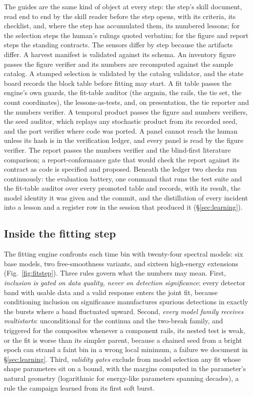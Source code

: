The guides are the same kind of object at every step: the step's skill
document, read end to end by the skill reader before the step opens, with
its criteria, its checklist, and, where the step has accumulated them, its
numbered lessons; for the selection
steps the human's rulings quoted verbatim; for the figure and report steps
the standing contracts. The sensors differ by step because the artifacts
differ. A harvest manifest is validated against its schema. An inventory
figure passes the figure verifier and its numbers are recomputed against
the sample catalog. A stamped selection is validated by the catalog
validator, and the state board records the block table before fitting may
start. A fit table passes the engine's own guards, the fit-table auditor
(the argmin, the rails, the tie set, the count coordinates), the
lessons-as-tests, and, on presentation, the tie reporter and the numbers
verifier. A temporal product passes the figure and numbers verifiers, the
seed auditor, which replays any stochastic product from its recorded seed,
and the port verifier where code was ported. A panel cannot reach the human
unless its hash is in the verification ledger, and every panel is read by
the figure verifier. The report passes the numbers verifier and the
blind-first literature comparison; a report-conformance gate that would
check the report against its contract as code is specified and proposed.
Beneath the ledger two checks run continuously: the evaluation battery,
one command that runs the test suite and the fit-table auditor over every
promoted table and records, with its result, the model identity it was
given and the commit,
and the distillation of every incident into a lesson and a register row
in the session that produced it (\S\ref{sec:learning}).

\subsection{Inside the fitting step} \label{sec:fitstep}

The fitting engine confronts each time bin with twenty-four spectral
models: six base models, two free-smoothness variants, and sixteen
high-energy extensions (Fig.~\ref{fig:fitstep}). Three rules govern what
the numbers may mean. First, \emph{inclusion is gated on data quality,
never on detection significance}: every detector band with usable data and
a valid response enters the joint fit, because conditioning inclusion on
significance manufactures spurious detections in exactly the bursts where a
band fluctuated upward. Second, \emph{every model family receives multistarts}: unconditional for
the continua and the two-break family, and triggered for the composites
whenever a component rails, its nested test is weak, or the fit is worse
than its simpler parent, because a chained seed from a bright epoch can strand a faint bin in a
wrong local minimum, a failure we document in \S\ref{sec:learning}. Third, \emph{validity gates} exclude from model
selection any fit whose shape parameters sit on a bound, with the margins
computed in the parameter's natural geometry (logarithmic for energy-like
parameters spanning decades), a rule the campaign learned from its first
soft burst.

